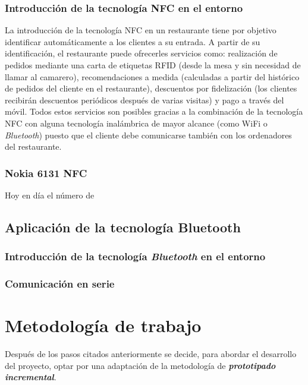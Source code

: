     \subsubsection{Introducción de la tecnología \acs{NFC} en el entorno}
  La introducción de la tecnología \acs{NFC} en un restaurante tiene por
  objetivo identificar automáticamente a los clientes a su entrada. A partir de
  su identificación, el restaurante puede ofrecerles servicios como:
  realización de pedidos mediante una carta de etiquetas \acs{RFID} (desde la
  mesa y sin necesidad de llamar al camarero), recomendaciones a medida
  (calculadas a partir del histórico de pedidos del cliente en el restaurante),
  descuentos por fidelización (los clientes recibirán descuentos periódicos
  después   de varias visitas) y pago a través del móvil. Todos estos servicios
  son posibles gracias a la combinación de la tecnología \acs{NFC} con alguna
  tecnología inalámbrica de mayor alcance (como \acs{WiFi} o \emph{Bluetooth})
  puesto que el cliente debe comunicarse también con los ordenadores del
  restaurante.
  
    \subsubsection{Nokia 6131 \acs{NFC}}
  Hoy en día el número de


  \subsection{Aplicación de la tecnología Bluetooth}
    \subsubsection{Introducción de la tecnología \emph{Bluetooth} en el
  entorno}

    \subsubsection{Comunicación en serie}


\section{Metodología de trabajo}
Después de los pasos citados anteriormente se decide, para abordar el
desarrollo del proyecto, optar por una adaptación de la metodología de 
\emph{\textbf{prototipado incremental}}.

